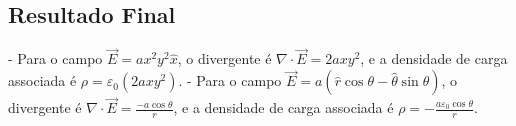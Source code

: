 \documentclass[a4paper,12pt]{article}
\newcommand{\printingbibliography}{%

    \pagestyle{myheadings}
    \markright{}
    \sloppy
    \printbibliography[heading=bibintoc, %
                   title=Refer\^encias %
                  ]
    \fussy%
}
\begin{document}
\begin{flushleft}
\section*{Resultado Final}

- Para o campo \( \vec{E} = a x^2 y^2 \hat{x} \), o divergente é \( \nabla \cdot \vec{E} = 2a x y^2 \), e a 
densidade de carga associada é \( \rho = \varepsilon_0 (2a x y^2) \).
- Para o campo \( \vec{E} = a ( \hat{r} \cos \theta - \hat{\theta} \sin \theta ) \), o divergente 
é \( \nabla \cdot \vec{E} = \frac{-a \cos \theta}{r} \), e a densidade de carga associada 
é \( \rho = -\frac{a \varepsilon_0 \cos \theta}{r} \).
\end{flushleft}



\end{document}
